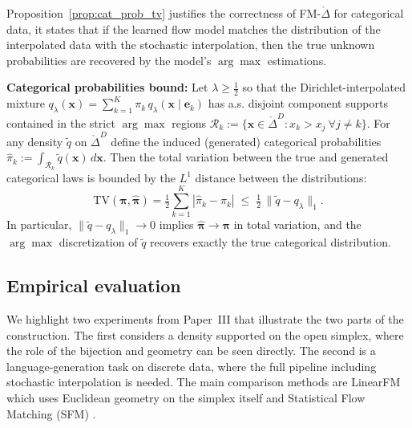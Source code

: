 Proposition~\ref{prop:cat_prob_tv} justifies the correctness of FM-$\mathring\Delta$ for categorical data, it states that if the learned flow model matches the distribution of the interpolated data with the stochastic interpolation, then the true unknown probabilities are recovered by the model's $\arg\max$ estimations. 


\begin{proposition} \label{prop:cat_prob_tv}
\textbf{Categorical probabilities bound:}
Let $\lambda \ge \tfrac{1}{2}$ so that the Dirichlet-interpolated mixture
$q_\lambda(\boldsymbol{x})=\sum_{k=1}^{K} \pi_k\, q_\lambda(\boldsymbol{x}\mid \boldsymbol{e}_k)$ 
has a.s. disjoint component supports contained in the strict $\arg\max$ regions
$\mathcal{R}_k := \{ \boldsymbol{x}\in \mathring \Delta^{D} : x_k > x_j\ \forall j\neq k\}$.
For any density $\tilde q$ on $\mathring \Delta^D$ define the induced (generated) categorical probabilities
$\hat \pi_k := \int_{\mathcal{R}_k} \tilde q(\boldsymbol{x})\,d\boldsymbol{x}$.
Then the total variation between the true and generated categorical laws is bounded by the $L^1$ distance between the distributions:
\begin{equation*}
\mathrm{TV}(\boldsymbol{\pi},\hat{ \boldsymbol{\pi}})= \tfrac{1}{2}\sum_{k=1}^{K} | \hat \pi_k - \pi_k |
\;\le\; \tfrac{1}{2}\,\|\tilde q - q_\lambda\|_{1}.
    \end{equation*}
In particular, $\|\tilde q - q_\lambda\|_{1}\to 0$ implies $\hat{\boldsymbol{\pi}} \to \boldsymbol{\pi}$ in total variation, and the $\arg\max$ discretization of $\tilde q$ recovers exactly the true categorical distribution.
\end{proposition}






\subsection*{Empirical evaluation}
We highlight two experiments from Paper~III that illustrate the two parts of the construction. The first considers a density supported on the open simplex, where the role of the bijection and geometry can be seen directly. The second is a language-generation task on discrete data, where the full pipeline including stochastic interpolation is needed. The main comparison methods are LinearFM which uses Euclidean geometry on the simplex itself and Statistical Flow Matching (SFM) \citep{Cheng2024, Davis2024}.

